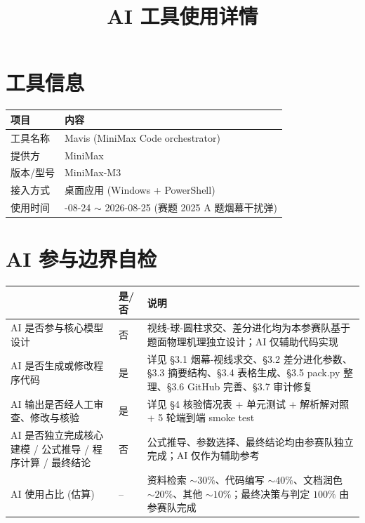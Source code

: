 \documentclass[electronic]{format}
\title{AI 工具使用详情}
\renewcommand{\textbf}[1]{{\song\bfseries #1}}
\begin{document}
\maketitle
\thispagestyle{plain}
\vspace{-2em}

\section{工具信息}

\begin{longtable}{>{\centering\arraybackslash}p{}>{\raggedright\arraybackslash}p{}}
  \toprule
  项目 & 内容 \\
  \midrule
  工具名称 & Mavis (MiniMax Code orchestrator) \\
  提供方 & MiniMax \\
  版本/型号 & MiniMax-M3 \\
  接入方式 & 桌面应用 (Windows + PowerShell) \\
  使用时间 & 2026-08-24 $\sim$ 2026-08-25 (赛题 2025 A 题烟幕干扰弹) \\
  \bottomrule
\end{longtable}

\section{AI 参与边界自检}

\begin{longtable}{>{\raggedright\arraybackslash}p{}>{\centering\arraybackslash}p{}>{\raggedright\arraybackslash}p{}}
  \toprule
  \textbf{自检项} & \textbf{是/否} & \textbf{说明} \\
  \midrule
  AI 是否参与核心模型设计 & 否 & 视线-球-圆柱求交、差分进化均为本参赛队基于题面物理机理独立设计；AI 仅辅助代码实现 \\
  AI 是否生成或修改程序代码 & 是 & 详见 §3.1 烟幕-视线求交、§3.2 差分进化参数、§3.3 摘要结构、§3.4 表格生成、§3.5 pack.py 整理、§3.6 GitHub 完善、§3.7 审计修复 \\
  AI 输出是否经人工审查、修改与核验 & 是 & 详见 §4 核验情况表 + 单元测试 + 解析解对照 + 5 轮端到端 smoke test \\
  AI 是否独立完成核心建模 / 公式推导 / 程序计算 / 最终结论 & 否 & 公式推导、参数选择、最终结论均由参赛队独立完成；AI 仅作为辅助参考 \\
  AI 使用占比 (估算) & -- & 资料检索 $\sim 30\%$、代码编写 $\sim 40\%$、文档润色 $\sim 20\%$、其他 $\sim 10\%$；最终决策与判定 $100\%$ 由参赛队完成 \\
  \bottomrule
\end{longtable}
\end{document}
